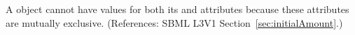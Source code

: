 A \Species object cannot have values for both its
 and  attributes because
these attributes are mutually exclusive.  (References: SBML L3V1
Section~\ref{sec:initialAmount}.)
